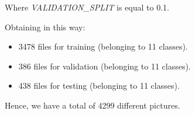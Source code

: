 \noindent Where \textit{VALIDATION\_SPLIT} is equal to 0.1.

\noindent Obtaining in this way:
 \begin{itemize}
	\item 3478 files for training (belonging to 11 classes).
	\item 386 files for validation (belonging to 11 classes).
	\item 438 files for testing (belonging to 11 classes).
\end{itemize}
\noindent Hence, we have a total of 4299 different pictures.
